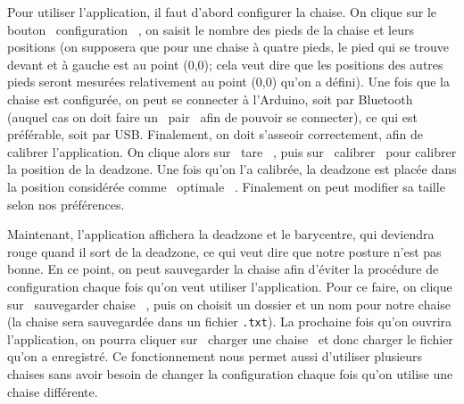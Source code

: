 \documentclass{polytech/polytech}
\begin{document}
Pour utiliser l'application, il faut d'abord configurer la chaise. On clique sur le bouton \guillemotleft\ configuration \guillemotright\ , on saisit le nombre des pieds de la chaise et leurs positions (on supposera que pour une chaise à quatre pieds, le pied qui se trouve devant et à gauche est au point (0,0); cela veut dire que les positions des autres pieds seront mesurées relativement au point (0,0) qu'on a défini). Une fois que la chaise est configurée, on peut se connecter à l'Arduino, soit par Bluetooth (auquel cas on doit faire un \guillemotleft\ pair \guillemotright\  afin de pouvoir se connecter), ce qui est préférable, soit par USB. Finalement, on doit s'asseoir correctement, afin de calibrer l'application. On clique alors sur \guillemotleft\ tare \guillemotright\ , puis sur \guillemotleft\ calibrer \guillemotright\  pour calibrer la position de la deadzone. Une fois qu'on l'a calibrée, la deadzone est placée dans la position considérée comme \guillemotleft\ optimale \guillemotright\ . Finalement on peut modifier sa taille selon nos préférences. 

Maintenant, l'application affichera la deadzone et le barycentre, qui deviendra rouge quand il sort de la deadzone, ce qui veut dire que notre posture n'est pas bonne. En ce point, on peut sauvegarder la chaise afin d'éviter la procédure de configuration chaque fois qu'on veut utiliser l'application. Pour ce faire, on clique sur \guillemotleft\ sauvegarder chaise \guillemotright\ , puis on choisit un dossier et un nom pour notre chaise (la chaise sera sauvegardée dans un fichier \texttt{.txt}). La prochaine fois qu'on ouvrira l'application, on pourra cliquer sur \guillemotleft\ charger une chaise \guillemotright\  et donc charger le fichier qu'on a enregistré. Ce fonctionnement nous permet aussi d'utiliser plusieurs chaises sans avoir besoin de changer la configuration chaque fois qu'on utilise une chaise différente.


\end{document}
